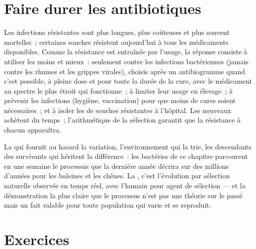\section{Faire durer les antibiotiques}

\begin{proposition}\label{prop:g11:antibiotic-resistance:consequences}
Les infections résistantes sont plus longues, plus coûteuses et plus
souvent mortelles~; certaines souches résistent aujourd'hui à tous les
médicaments disponibles. Comme la résistance est entraînée par l'usage,
la réponse consiste à utiliser les  moins et mieux~:
seulement contre les infections bactériennes (jamais contre les rhumes
et les grippes virales), choisis après un antibiogramme quand c'est
possible, à pleine dose et pour toute la durée de la cure, avec le
médicament au spectre le plus étroit qui fonctionne~; à limiter leur
usage en élevage~; à prévenir les infections (hygiène, vaccination)
pour que moins de cures soient nécessaires~; et à isoler les 
de souches résistantes à l'hôpital. Les nouveaux 
achètent du temps~; l'arithmétique de la sélection garantit que la
résistance à chacun apparaîtra.
\end{proposition}
\admitted

\begin{remark}\label{rem:g11:antibiotic-resistance:evolution}
La  qui fournit au hasard la variation, l'environnement qui la
trie, les descendants des survivants qui héritent la différence~: les
bactéries de ce chapitre parcourent en une semaine le processus que la
dernière année décrira sur des millions d'années pour les baleines et
les chênes. La , c'est l'évolution par
sélection naturelle observée en temps réel, avec l'humain pour agent
de sélection --- et la démonstration la plus claire que le processus
n'est pas une théorie sur le passé mais un fait valable pour toute
population qui varie et se reproduit.
\end{remark}

\section{Exercices}

